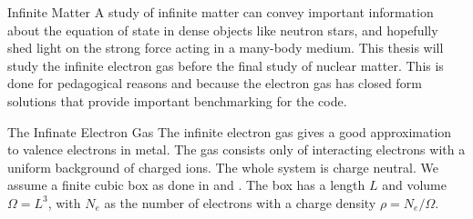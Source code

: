\documentclass[twoside,english]{uiofysmaster}
\begin{document}
\begin{chapter}{Infinite Matter}
	A study of infinite matter can convey important information about the equation of state in dense objects like neutron stars, and hopefully shed light on the strong force acting in a many-body medium. This thesis will study the infinite electron gas before the final study of nuclear matter. This is done for pedagogical reasons and because the electron gas has closed form solutions that provide important benchmarking for the code. 
	\begin{section}{The Infinate Electron Gas}
		The infinite electron gas gives a good approximation to valence electrons in metal. The gas consists only of interacting electrons with a uniform background of charged ions. The whole system is charge neutral. We assume a finite cubic box as done in \cite{Shepherd2012} and \cite{Shepherd2013}. The box has a length $L$ and volume $\Omega = L^3$, with $N_e$ as the number of electrons with a charge density $\rho = N_e / \Omega$.


\end{section}
\end{chapter}
\end{document}
